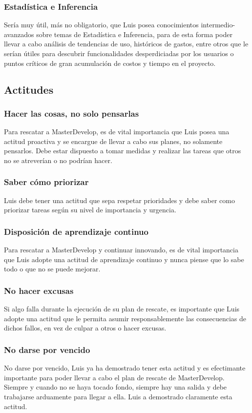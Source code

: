 \documentclass{article}
\begin{document}
    \subsubsection{Estadística e Inferencia}
    	Sería muy útil, más no obligatorio, que Luis posea 
	conocimientos intermedio-avanzados sobre temas de Estadística
	e Inferencia, para de esta forma poder llevar a cabo análisis
	de tendencias de uso, históricos de gastos, entre otros 
	que le serían útiles para descubrir funcionalidades 
	desperdiciadas por los usuarios o puntos críticos de gran 
	acumulación de costos y tiempo en el proyecto.

    \subsection{Actitudes}
    \subsubsection{Hacer las cosas, no solo pensarlas}
    Para rescatar a MasterDevelop, es de vital importancia
    que Luis posea una actitud proactiva y se encargue de llevar
    a cabo sus planes, no solamente pensarlos. Debe estar dispuesto
    a tomar medidas y realizar las tareas que otros no se atreverían 
    o no podrían hacer.
    \subsubsection{Saber cómo priorizar}
    Luis debe tener una actitud que sepa respetar prioridades
    y debe saber como priorizar tareas según su nivel de importancia
    y urgencia.
    \subsubsection{Disposición de aprendizaje continuo}
    Para rescatar a MasterDevelop y continuar innovando, es de vital
    importancia que Luis adopte una actitud de aprendizaje continuo
    y nunca piense que lo sabe todo o que no se puede mejorar.
    \subsubsection{No hacer excusas}
    Si algo falla durante la ejecución de su plan de rescate, es 
    importante que Luis adopte una actitud que le permita asumir
    responsablemente las consecuencias de dichos fallos, en vez
    de culpar a otros o hacer excusas. 
    \subsubsection{No darse por vencido}
    No darse por vencido, Luis ya ha demostrado tener esta actitud
    y es efectimante importante para poder llevar a cabo el plan
    de rescate de MasterDevelop. Siempre y cuando no se haya tocado
    fondo, siempre hay una salida y debe trabajarse arduamente para
    llegar a ella. Luis a demostrado claramente esta actitud.
\end{document}
